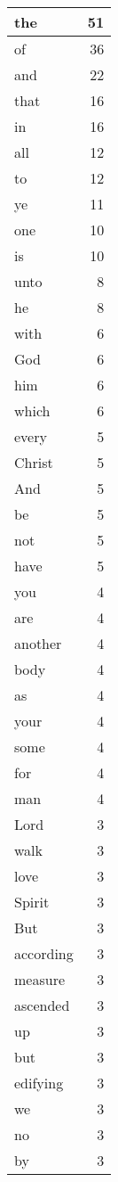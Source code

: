 \begin{center}
\begin{longtable}{l|r}
the & 51\\ \hline 
of & 36\\ \hline 
and & 22\\ \hline 
that & 16\\ \hline 
in & 16\\ \hline 
all & 12\\ \hline 
to & 12\\ \hline 
ye & 11\\ \hline 
one & 10\\ \hline 
is & 10\\ \hline 
unto & 8\\ \hline 
he & 8\\ \hline 
with & 6\\ \hline 
God & 6\\ \hline 
him & 6\\ \hline 
which & 6\\ \hline 
every & 5\\ \hline 
Christ & 5\\ \hline 
And & 5\\ \hline 
be & 5\\ \hline 
not & 5\\ \hline 
have & 5\\ \hline 
you & 4\\ \hline 
are & 4\\ \hline 
another & 4\\ \hline 
body & 4\\ \hline 
as & 4\\ \hline 
your & 4\\ \hline 
some & 4\\ \hline 
for & 4\\ \hline 
man & 4\\ \hline 
Lord & 3\\ \hline 
walk & 3\\ \hline 
love & 3\\ \hline 
Spirit & 3\\ \hline 
But & 3\\ \hline 
according & 3\\ \hline 
measure & 3\\ \hline 
ascended & 3\\ \hline 
up & 3\\ \hline 
but & 3\\ \hline 
edifying & 3\\ \hline 
we & 3\\ \hline 
no & 3\\ \hline 
by & 3\\ \hline 

\end{longtable}
\end{center}
